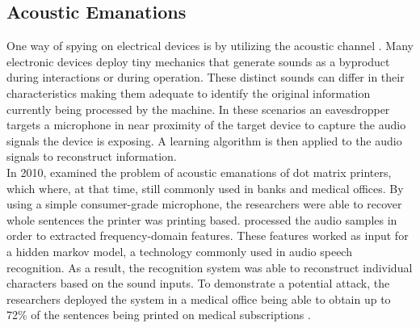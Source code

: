 



\subsection{Acoustic Emanations}
One way of spying on electrical devices is by utilizing the acoustic channel \cite{Backes:2010:ASA:1929820.1929847,1301311,Zhuang:2009:KAE:1609956.1609959}. Many electronic devices deploy tiny mechanics that generate sounds as a byproduct during interactions or during operation. These distinct sounds can differ in their characteristics making them adequate to identify the original information currently being processed by the machine. In these scenarios an eavesdropper targets a microphone in near proximity of the target device to capture the audio signals the device is exposing. A learning algorithm is then applied to the audio signals to reconstruct information. \\

In 2010, \citeauthor{Backes:2010:ASA:1929820.1929847} examined the problem of acoustic emanations of dot matrix printers, which where, at that time, still commonly used in banks and medical offices. By using a simple consumer-grade microphone, the researchers were able to recover whole sentences the printer was printing based. \citeauthor{Backes:2010:ASA:1929820.1929847} processed the audio samples in order to extracted frequency-domain features. These features worked as input for a hidden markov model, a technology commonly used in audio speech recognition. As a result, the recognition system was able to reconstruct individual characters based on the sound inputs. To demonstrate a potential attack, the researchers deployed the system in a medical office being able to obtain up to 72\% of the sentences being printed on medical subscriptions \cite{Backes:2010:ASA:1929820.1929847}. \\

